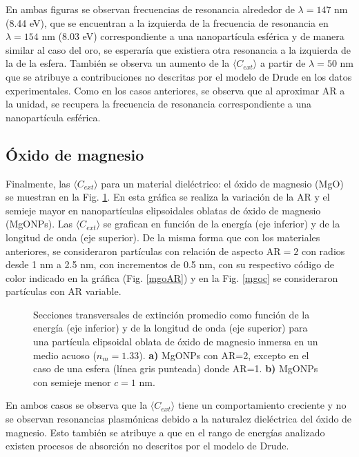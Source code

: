 En ambas figuras se observan frecuencias de resonancia alrededor de $\lambda=147$ nm (8.44 eV), que se encuentran a la izquierda de la frecuencia de resonancia en $\lambda=154$ nm (8.03 eV) correspondiente a una nanopartícula esférica y de manera similar al caso del oro, se esperaría que existiera otra resonancia a la izquierda de la de la esfera. También se observa un aumento de la $\langle C_{ext}\rangle$ a partir de $\lambda=50$ nm  que se atribuye a contribuciones no descritas por el modelo de Drude en los datos experimentales. Como en los casos anteriores, se observa que al aproximar AR a la unidad, se recupera la frecuencia de resonancia correspondiente a una nanopartícula esférica.



\subsection*{Óxido de magnesio}
Finalmente, las $\langle C_{ext}\rangle$ para un material dieléctrico: el óxido de magnesio (MgO) se muestran en la Fig. \ref{mgo}. En esta gráfica se realiza la variación de la AR y el semieje mayor en nanopartículas elipsoidales oblatas de óxido de magnesio (MgONPs). Las $\langle C_{ext}\rangle$ se grafican en función de la energía (eje inferior) y de la longitud de onda (eje superior). De la misma forma que con los materiales anteriores, se consideraron partículas con relación de aspecto AR$=2$ con radios desde 1  nm a 2.5 nm, con incrementos de 0.5 nm, con su respectivo código de color indicado en la gráfica (Fig. \ref{mgoAR}) y en la Fig. \ref{mgoc} se consideraron partículas con AR variable. 

\begin{figure}[H]
	\quad%
	\caption{Secciones transversales de extinción promedio como función de la energía (eje inferior) y de la longitud de onda (eje superior) para una partícula elipsoidal oblata de óxido de magnesio inmersa en un medio acuoso ($n_m=1.33$). \textbf{a)} MgONPs con AR=2, excepto en el caso de una esfera (línea gris punteada) donde AR=1. \textbf{b)}  MgONPs con semieje menor $c=1$ nm.}\label{mgo}
\end{figure}

En ambos casos se observa que la $\langle C_{ext}\rangle$ tiene un comportamiento creciente y no se observan resonancias plasmónicas debido a la naturalez dieléctrica del óxido de magnesio. Esto también se atribuye a que en el rango de energías analizado existen procesos de absorción no descritos por el modelo de Drude.








